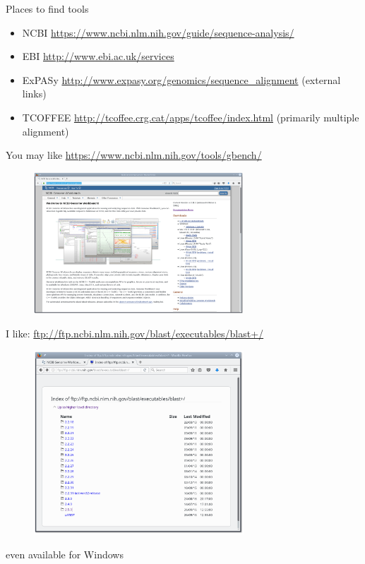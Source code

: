 \documentclass[pdf]{beamer}
\begin{document}
\begin{frame}{Places to find tools}
  \begin{itemize}
  \item NCBI \url{https://www.ncbi.nlm.nih.gov/guide/sequence-analysis/}
  \item EBI \url{http://www.ebi.ac.uk/services}
  \item ExPASy \url{http://www.expasy.org/genomics/sequence_alignment}
    (external links)
  \item TCOFFEE \url{http://tcoffee.crg.cat/apps/tcoffee/index.html}
    (primarily multiple alignment)
  \end{itemize}
\end{frame}

\begin{frame}{You may like}
  \url{https://www.ncbi.nlm.nih.gov/tools/gbench/}
  \begin{figure}[ht]
    \includegraphics[width=0.7\textwidth]{images/NCBI_genome_work_bench}
  \end{figure}
\end{frame}

\begin{frame}{I like:}
  \url{ftp://ftp.ncbi.nlm.nih.gov/blast/executables/blast+/}
  \begin{figure}[ht]
    \includegraphics[width=0.7\textwidth]{images/ncbi_blast_download_page.png}
  \end{figure}
  even available for Windows
\end{frame}
\end{document}
